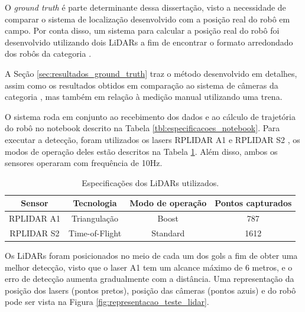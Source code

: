 \documentclass[acronym, symbols, table, deposito]{fei}
\begin{document}
	O \textit{ground truth} é parte determinante dessa dissertação, visto a necessidade de comparar o sistema de localização desenvolvido com a posição real do robô em campo. Por conta disso, um sistema para calcular a posição real do robô foi desenvolvido utilizando dois LiDARs a fim de encontrar o formato arredondado dos robôs da categoria .
	
	A Seção \ref{sec:resultados_ground_truth} traz o método desenvolvido em detalhes, assim como os resultados obtidos em comparação ao sistema de câmeras da categoria , mas também em relação à medição manual utilizando uma trena.
	
	O sistema roda em conjunto ao recebimento dos dados e ao cálculo de trajetória do robô no notebook descrito na Tabela \ref{tbl:especificacoes_notebook}. Para executar a detecção, foram utilizados os lasers RPLIDAR A1 \cite{rplidar_a1} e RPLIDAR S2 \cite{rplidar_s2}, os modos de operação deles estão descritos na Tabela \ref{tbl:especificacoes_laser}. Além disso, ambos os sensores operaram com frequência de 10Hz.
	
	\begin{table}[!htb]
		\centering
		\caption{Especificações dos LiDARs utilizados.}
		\label{tbl:especificacoes_laser}
		\begin{tabular}{|c|c|c|c|}
			\hline
			Sensor 				& Tecnologia		& Modo de operação 	& Pontos capturados\\ \hline
			RPLIDAR A1			& Triangulação 		& Boost 			& 787 \\ \hline
			RPLIDAR S2 			& Time-of-Flight 	& Standard		    & 1612 \\ \hline
		\end{tabular}
	\end{table}

	Os LiDARs foram posicionados no meio de cada um dos gols a fim de obter uma melhor detecção, visto que o laser A1 tem um alcance máximo de 6 metros, e o erro de detecção aumenta gradualmente com a distância. Uma representação da posição dos lasers (pontos pretos), posição das câmeras (pontos azuis) e do robô pode ser vista na Figura \ref{fig:representacao_teste_lidar}.
	
\end{document}

